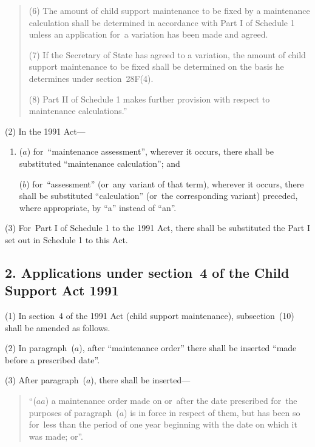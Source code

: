 \documentclass[12pt,a4paper]{article}
\begin{document}
\begin{quotation}
(6) The amount of child support maintenance to be fixed by a maintenance calculation shall be determined in accordance with Part I of Schedule 1 unless an application for~a variation has been made and agreed.

(7) If the Secretary of State has agreed to a variation, the amount of child support maintenance to be fixed shall be determined on the basis he determines under section~28F(4).

(8) Part II of Schedule 1 makes further provision with respect to maintenance calculations.”
\end{quotation}

(2) In the 1991 Act—
\begin{enumerate}\item[]
($a$) for~“maintenance assessment”, wherever it occurs, there shall be substituted “maintenance calculation”; and

($b$) for~“assessment” (or~any variant of that term), wherever it occurs, there shall be substituted “calculation” (or~the corresponding variant) preceded, where appropriate, by “a” instead of “an”.
\end{enumerate}

(3) For~Part I of Schedule 1 to the 1991 Act, there shall be substituted the Part I set out in Schedule 1 to this Act.



\subsection{2. Applications under section~4 of the Child Support Act 1991}

(1) In section~4 of the 1991 Act (child support maintenance), subsection~(10)  shall be amended as follows.

(2) In paragraph~($a$), after “maintenance order” there shall be inserted “made before a prescribed date”.

(3) After paragraph~($a$), there shall be inserted—
\begin{quotation}
“($aa$) a maintenance order made on or~after the date prescribed for~the purposes of paragraph~($a$)  is in force in respect of them, but has been so for~less than the period of one year beginning with the date on which it was made; or”.
\end{quotation}
\end{document}
